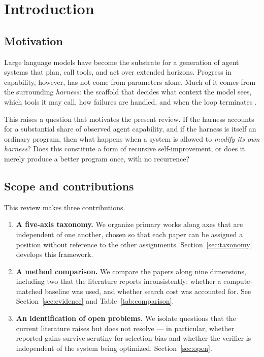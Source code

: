 \section{Introduction}
\label{sec:intro}


\subsection{Motivation}

Large language models have become the substrate for a generation of agent
systems that plan, call tools, and act over extended horizons. Progress in
capability, however, has not come from parameters alone. Much of it comes from
the surrounding \emph{harness}: the scaffold that decides what context the model
sees, which tools it may call, how failures are handled, and when the loop
terminates .

This raises a question that motivates the present review. If the harness
accounts for a substantial share of observed agent capability, and if the
harness is itself an ordinary program, then what happens when a system is
allowed to \emph{modify its own harness}? Does this constitute a form of
recursive self-improvement, or does it merely produce a better program once,
with no recurrence?

\subsection{Scope and contributions}

This review makes three contributions.

\begin{enumerate}
    \item \textbf{A five-axis taxonomy.} We organize  primary works
    along axes that are independent of one another, chosen so that each paper
    can be assigned a position without reference to the other assignments.
    Section~\ref{sec:taxonomy} develops this framework.

    \item \textbf{A method comparison.} We compare the papers along nine
    dimensions, including two that the literature reports inconsistently:
    whether a compute-matched baseline was used, and whether search cost was
    accounted for. See Section~\ref{sec:evidence} and
    Table~\ref{tab:comparison}.

    \item \textbf{An identification of open problems.} We isolate
     questions that the current literature raises but does not
    resolve --- in particular, whether reported gains survive scrutiny for
    selection bias and whether the verifier is independent of the system being
    optimized. Section~\ref{sec:open}.
\end{enumerate}

